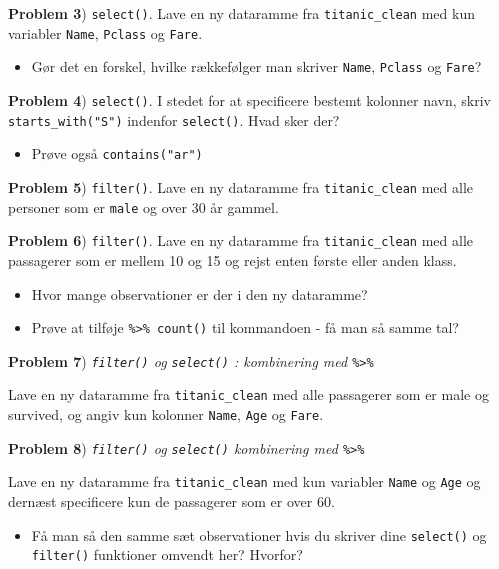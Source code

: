 \documentclass[
]{book}
\providecommand{\tightlist}{%
  \setlength{\itemsep}{0pt}\setlength{\parskip}{0pt}}
\begin{document}
\textbf{Problem 3}) \texttt{select()}. Lave en ny dataramme fra \texttt{titanic\_clean} med kun variabler \texttt{Name}, \texttt{Pclass} og \texttt{Fare}.

\begin{itemize}
\tightlist
\item
  Gør det en forskel, hvilke rækkefølger man skriver \texttt{Name}, \texttt{Pclass} og \texttt{Fare}?
\end{itemize}

\textbf{Problem 4}) \texttt{select()}. I stedet for at specificere bestemt kolonner navn, skriv \texttt{starts\_with("S")} indenfor \texttt{select()}. Hvad sker der?

\begin{itemize}
\tightlist
\item
  Prøve også \texttt{contains("ar")}
\end{itemize}

\textbf{Problem 5}) \texttt{filter()}. Lave en ny dataramme fra \texttt{titanic\_clean} med alle personer som er \texttt{male} og over 30 år gammel.

\textbf{Problem 6}) \texttt{filter()}. Lave en ny dataramme fra \texttt{titanic\_clean} med alle passagerer som er mellem 10 og 15 og rejst enten første eller anden klass.

\begin{itemize}
\tightlist
\item
  Hvor mange observationer er der i den ny dataramme?
\item
  Prøve at tilføje \texttt{\%\textgreater{}\%\ count()} til kommandoen - få man så samme tal?
\end{itemize}

\textbf{Problem 7}) \emph{\texttt{filter()} og \texttt{select()} : kombinering med \texttt{\%\textgreater{}\%}}

Lave en ny dataramme fra \texttt{titanic\_clean} med alle passagerer som er male og survived, og angiv kun kolonner \texttt{Name}, \texttt{Age} og \texttt{Fare}.

\textbf{Problem 8}) \emph{\texttt{filter()} og \texttt{select()} kombinering med \texttt{\%\textgreater{}\%}}

Lave en ny dataramme fra \texttt{titanic\_clean} med kun variabler \texttt{Name} og \texttt{Age} og dernæst specificere kun de passagerer som er over 60.

\begin{itemize}
\tightlist
\item
  Få man så den samme sæt observationer hvis du skriver dine \texttt{select()} og \texttt{filter()} funktioner omvendt her? Hvorfor?
\end{itemize}
\end{document}
